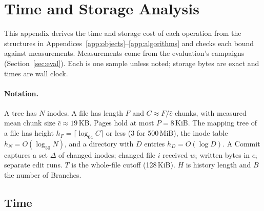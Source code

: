 \section{Time and Storage Analysis}
\label{app:analysis}

This appendix derives the time and storage cost of each operation from the structures
in Appendices~\ref{app:objects}--\ref{app:algorithms} and checks each bound against
measurements. Measurements come from the evaluation's campaigns
(Section~\ref{sec:eval}). Each is one sample unless noted; storage bytes are exact and
times are wall clock.

\paragraph{Notation.} A tree has $N$ inodes. A file has length $F$ and $C \approx
F/\bar{c}$ chunks, with measured mean chunk size $\bar{c} \approx 19$\,KB. Pages hold at
most $P = 8$\,KiB. The mapping tree of a file has height $h_F = \lceil \log_{64} C \rceil$
or less (3 for 500\,MiB), the inode table $h_N = O(\log_{50} N)$, and a directory with $D$
entries $h_D = O(\log D)$. A Commit captures a set $\Delta$ of changed inodes; changed
file $i$ received $w_i$ written bytes in $e_i$ separate edit runs. $T$ is the whole-file
cutoff (128\,KiB). $H$ is history length and $B$ the number of Branches.

\subsection{Time}

